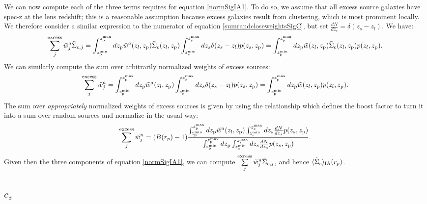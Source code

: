 \documentclass[onecolumn,amsmath,aps,fleqn, superscriptaddress]{revtex4}
\begin{document}
We can now compute each of the three terms requires for equation \ref{normSigIA1}. To do so, we assume that all excess source galaxies have spec-z at the lens redshift; this is a reasonable assumption because excess galaxies result from clustering, which is most prominent locally. We therefore consider a similar expression to the numerator of equation \ref{sumrandcloseweightsSigC}, but set $\frac{dN}{dz_s} = \delta(z_s-z_l)$. We have:
\begin{align}
\sum\limits_{j}^{\rm excess} \tilde{w}^a_j \tilde{\Sigma}_{c,j} = \int_{z_{\rm p}^{\rm min}}^{z_{\rm p}^{\rm max}} dz_{\rm p}\tilde{w}^a(z_l, z_{\rm p}) \tilde{\Sigma}_c(z_l, z_{\rm p}) \int_{z_s^{\rm min}}^{z_s^{\rm max}} dz_s \delta(z_s - z_l) p(z_s, z_{\rm p}) = \int_{z_{\rm p}^{\rm min}}^{z_{\rm p}^{\rm max}} dz_{\rm p}\tilde{w}(z_l, z_{\rm p}) \tilde{\Sigma}_c(z_l, z_{\rm p}) p(z_l, z_{\rm p}).
\label{wSigc_atzl}
\end{align}
We can similarly compute the sum over arbitrarily normalized weights of excess sources:
\begin{align}
\sum\limits_{j}^{\rm excess} \tilde{w}^a_j= \int_{z_{\rm p}^{\rm min}}^{z_{\rm p}^{\rm max}} dz_{\rm p}\tilde{w}^a(z_l, z_{\rm p}) \int_{z_s^{\rm min}}^{z_s^{\rm max}} dz_s \delta(z_s - z_l) p(z_s, z_{\rm p}) = \int_{z_{\rm p}^{\rm min}}^{z_{\rm p}^{\rm max}} dz_{\rm p}\tilde{w}(z_l, z_{\rm p})  p(z_l, z_{\rm p}).
\label{excess_w_arb}
\end{align}
The sum over {\it appropriately} normalized weights of excess sources is given by using the relationship which defines the boost factor to turn it into a sum over random sources and normalize in the usual way:
\begin{equation}
\sum\limits_{j}^{\rm excess} \tilde{w}^n_j = (B(r_p)-1) \frac{ \int_{z_{\rm p}^{\rm min}}^{z_{\rm p}^{\rm max}} dz_{\rm p}\tilde{w}^a(z_l, z_{\rm p}) \int_{z_s^{\rm min}}^{z_s^{\rm max}} dz_s \frac{dN}{dz_s} p(z_s, z_{\rm p})}{\int_{z_{\rm p}^{\rm min}}^{z_{\rm p}^{\rm max}} dz_{\rm p} \int_{z_s^{\rm min}}^{z_s^{\rm max}} dz_s \frac{dN}{dz_s} p(z_s, z_{\rm p})}.
\label{excess_w_normed}
\end{equation}
Given then the three components of equation \ref{normSigIA1}, we can compute $\sum\limits_{j}^{\rm excess} \tilde{w}^n_j \tilde{\Sigma}_{c,j}$, and hence $\langle \tilde{\Sigma}_c\rangle_{\rm IA}(r_p)$.

\subsection{$c_z$}
\end{document}
